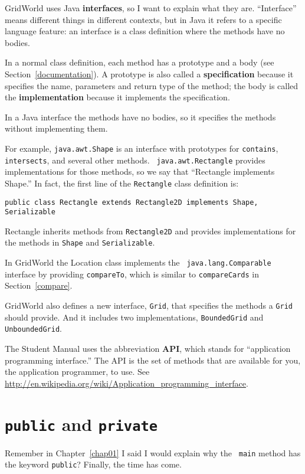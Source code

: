 \documentclass[12pt]{book}
\theoremstyle{definition}
\begin{document}
GridWorld uses Java {\bf interfaces}, so I want to explain what
they are.  ``Interface'' means different things in different contexts,
but in Java it refers to a specific language feature:
an interface is a class definition where the methods have no bodies.

In a normal class definition, each method has a prototype and a
body (see Section~\ref{documentation}).  A prototype is also called a
{\bf specification} because it specifies the name, parameters and
return type of the method; the body is called the {\bf implementation}
because it implements the specification.

In a Java interface the methods have no bodies, so it specifies 
the methods without implementing them.

For example, {\tt java.awt.Shape} is an interface with prototypes for
{\tt contains}, {\tt intersects}, and several other methods.  {\tt
  java.awt.Rectangle} provides implementations for those methods, so
we say that ``Rectangle implements Shape.''  In fact, the first line
of the {\tt Rectangle} class definition is:

\begin{lstlisting}
public class Rectangle extends Rectangle2D implements Shape, Serializable
\end{lstlisting}

Rectangle inherits methods from {\tt Rectangle2D} and provides
implementations for the methods in {\tt Shape} and {\tt Serializable}.

In GridWorld the Location class implements the {\tt
  java.lang.Comparable} interface by providing {\tt compareTo}, which
is similar to {\tt compareCards} in Section~\ref{compare}.

GridWorld also defines a new interface, {\tt Grid}, that specifies
the methods a {\tt Grid} should provide.  And it includes two
implementations, {\tt BoundedGrid} and {\tt UnboundedGrid}.

The Student Manual uses the abbreviation {\bf API}, which stands for
``application programming interface.''  The API is the set of methods
that are available for you, the application programmer, to use.  See
\url{http://en.wikipedia.org/wiki/Application_programming_interface}.


\section{{\tt public} and {\tt private}}

Remember in Chapter~\ref{chap01} I said I would explain why the {\tt
  main} method has the keyword {\tt public}?  Finally, the time has
come.
\end{document}
